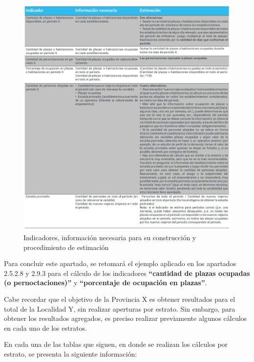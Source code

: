 \documentclass[
]{book}
\begin{document}
\begin{figure}

{\centering \includegraphics[width=0.8\linewidth]{imagenes/tabla_8} 

}

\caption{Indicadores, información necesaria para su construcción y procedimiento de estimación}\label{fig:indicadores}
\end{figure}

Para concluir este apartado, se retomará el ejemplo aplicado en los apartados 2.5.2.8 y 2.9.3 para el cálculo de los indicadores \textbf{``cantidad de plazas ocupadas (o pernoctaciones)''} y \textbf{``porcentaje de ocupación en plazas''}.

Cabe recordar que el objetivo de la Provincia X es obtener resultados para el total de la Localidad Y, sin realizar aperturas por estrato. Sin embargo, para obtener los resultados agregados, es preciso realizar previamente algunos cálculos en cada uno de los estratos.

En cada una de las tablas que siguen, en donde se realizan los cálculos por estrato, se presenta la siguiente información:
\end{document}
